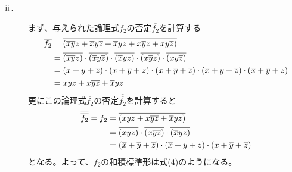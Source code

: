\documentclass{jsarticle}
\begin{document}
\begin{description}
\begin{description}
\begin{description}
              \item [$\rm \hspace{.08em}ii\hspace{.08em}$.]
              まず、与えられた論理式$f_2$の否定$\overline{f_2}$を計算する
              \begin{align}
                  \overline{f_2}
                  &= \overline{(\overline{xy}z + \overline{x}y\overline{z} + \overline{x}yz + x\overline{y}z + xy\overline{z})} \notag \\
                  &= \overline{(\overline{xy}z)} \cdot \overline{(\overline{x}y\overline{z})} \cdot \overline{(\overline{x}yz)} \cdot \overline{(x\overline{y}z)} \cdot \overline{(xy\overline{z})} \notag \\
                  &= (x+y+\overline{z}) \cdot (x+\overline{y}+z) \cdot (x+\overline{y}+\overline{z}) \cdot (\overline{x}+y+\overline{z}) \cdot (\overline{x}+\overline{y}+z) \notag \\
                  &= xyz + x\overline{yz} + \overline{x}yz
              \end{align}
              更にこの論理式$\overline{f_2}$の否定$\overline{\overline{f_2}}$を計算すると
              \begin{align}
                  \overline{\overline{f_2}} = f_2
                  &= \overline{(xyz + x\overline{yz} + \overline{x}yz)} \notag \\
                  &= \overline{(xyz)} \cdot \overline{(x\overline{yz})} \cdot \overline{(\overline{x}yz)} \notag \\
                  &= (\overline{x}+\overline{y}+\overline{z}) \cdot (\overline{x}+y+z) \cdot (x+\overline{y}+\overline{z})
              \end{align}
              となる。よって、$f_2$の和積標準形は式(4)のようになる。


\end{description}
\end{description}
\end{description}
\end{document}
